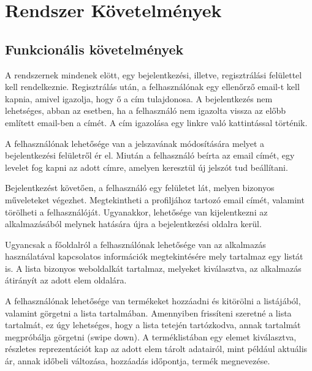 
\section{Rendszer Követelmények}

\subsection{Funkcionális követelmények}

A rendszernek mindenek elött, egy bejelentkezési, illetve, regisztrálási felülettel kell rendelkeznie. Regisztrálás után, a felhasználónak egy ellenőrző email-t kell kapnia, amivel igazolja, hogy ő a cím tulajdonosa. A bejelentkezés nem lehetséges, abban az esetben, ha a felhasználó nem igazolta vissza az előbb említett email-ben a címét. A cím igazolása egy linkre való kattintással történik.

A felhasználónak lehetősége van a jelszavának módosítására melyet a bejelentkezési felületről ér el. Miután a felhasználó beírta az email címét, egy levelet fog kapni az adott címre, amelyen keresztül új jelszót tud beállítani.

Bejelentkezést követően, a felhasználó egy felületet lát, melyen bizonyos műveleteket végezhet. Megtekintheti a profiljához tartozó email címét, valamint törölheti a felhasználóját. Ugyanakkor, lehetősége van kijelentkezni az alkalmazásából melynek hatására újra a bejelentkezési oldalra kerül.

Ugyancsak a főoldalról a felhasználónak lehetősége van az alkalmazás használatával kapcsolatos információk megtekintésére mely tartalmaz egy listát is. A lista bizonyos weboldalkát tartalmaz, melyeket kiválasztva, az alkalmazás átirányít az adott elem oldalára.

A felhasználónak lehetősége van termékeket hozzáadni és kitörölni a listájából, valamint görgetni a lista tartalmában. Amennyiben frissíteni szeretné a lista tartalmát, ez úgy lehetséges, hogy a lista tetején tartózkodva, annak tartalmát megpróbálja görgetni (swipe down). A terméklistában egy elemet kiválasztva, részletes reprezentációt kap az adott elem tárolt adatairól, mint például aktuális ár, annak időbeli változása, hozzáadás időpontja, termék megnevezése.

